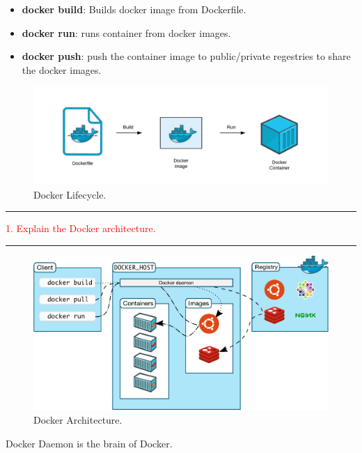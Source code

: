 \documentclass{article}
\begin{document}
\begin{itemize}
\color{blue}
\item \textbf{docker build}: Builds docker image from Dockerfile.
\item \textbf{docker run}: runs container from docker images.
\item \textbf{docker push}: push the container image to public/private regestries to share the docker images.
\end{itemize}
\begin{figure}
\centering
\includegraphics[width=0.95\linewidth]{Docker1.jpg}
\caption{\label{fig:Docker2}Docker Lifecycle.}
\end{figure}
\newpage
\noindent
{\color{red} \rule{\linewidth}{0.5mm}}
\textcolor{red}{1. Explain the Docker architecture.} \\
\noindent
{\color{red} \rule{\linewidth}{0.5mm}}

\begin{figure}
\centering
\includegraphics[width=0.95\linewidth]{DockerArchi.png}
\caption{\label{fig:Docker2}Docker Architecture.}
\end{figure}
\begin{tcolorbox}[colback=red!5!white]
    Docker Daemon is the brain of Docker.
\end{tcolorbox}
    
\end{document}
